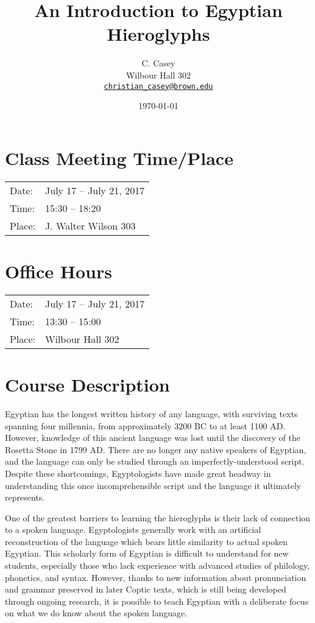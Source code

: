 \documentclass[11pt]{article}
\begin{document}
	
	\title{An Introduction to Egyptian Hieroglyphs}
	\author{C. Casey \\
		Wilbour Hall 302 \\
  		\texttt{\href{mailto:christian_casey@brown.edu}{christian\_casey@brown.edu}}}
	\date{\today}
	\maketitle
	
	\section*{Class Meeting Time/Place}
	
		\begin{tabular}{l l}
		Date: & July 17 -- July 21, 2017 \\
		Time: & 15:30 -- 18:20 \\		%
		Place: & J. Walter Wilson 303		%
		\end{tabular}
		
	\section*{Office Hours}
		\begin{tabular}{l l}
		Date: & July 17 -- July 21, 2017 \\
		Time: & 13:30 -- 15:00 \\					%
		Place: & Wilbour Hall 302
		\end{tabular}
		
	\section*{Course Description}
		Egyptian has the longest written history of any language, with surviving texts spanning four millennia, from approximately 3200 BC to at least 1100 AD. However, knowledge of this ancient language was lost until the discovery of the Rosetta Stone in 1799 AD. There are no longer any native speakers of Egyptian, and the language can only be studied through an imperfectly-understood script. Despite these shortcomings, Egyptologists have made great headway in understanding this once incomprehensible script and the language it ultimately represents. 
	
		One of the greatest barriers to learning the hieroglyphs is their lack of connection to a spoken language. Egyptologists generally work with an artificial reconstruction of the language which bears little similarity to actual spoken Egyptian. This scholarly form of Egyptian is difficult to understand for new students, especially those who lack experience with advanced studies of philology, phonetics, and syntax. However, thanks to new information about pronunciation and grammar preserved in later Coptic texts, which is still being developed through ongoing research, it is possible to teach Egyptian with a deliberate focus on what we do know about the spoken language. 
	
\end{document}
